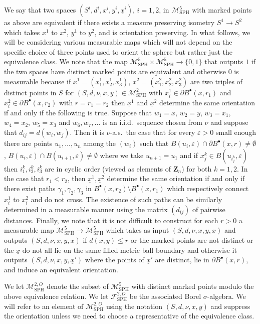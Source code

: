 \documentclass[10pt]{amsart}
\let\mathcal\mathscr
\newcommand{\sbullet}{{\scriptscriptstyle\bullet}}
\let\epsilon\varepsilon
\theoremstyle{plain}
\numberwithin{theorem}{section}
\theoremstyle{definition}
\newcommand\gmsspace{{\mathcal M}_{\mathrm{SPH}}}
\newcommand{\mmsigmaspho}{{\mathcal F}_{\mathrm{SPH}}^{2,O}}
\newcommand{\Z}{\mathbf{Z}}
\let\ul\underline
\newcommand{\fb}[2]{B^\sbullet(#1,#2)}
\begin{document}
We say that two spaces $(S^i,d^i,x^i,y^i,\ul{x}^i)$, $i=1,2$, in $\gmsspace^5$ with marked points as above are equivalent if there exists a measure preserving isometry $S^1 \to S^2$ which takes $x^1$ to $x^2$, $y^1$ to $y^2$, and is orientation preserving. In what follows, we will be considering various measurable maps which will not depend on the specific choice of three points used to orient the sphere but rather just the equivalence class. We note that the map $\gmsspace^5 \times \gmsspace^5 \to \{0,1\}$ that outputs $1$ if the two spaces have distinct marked points are equivalent and otherwise $0$ is measurable because if $\ul{x}^1 = (x_1^1,x_2^1,x_3^1)$, $\ul{x}^2 = (x_1^2,x_2^2,x_3^2)$ are two triples of distinct points in $S$ for $(S,d,\nu,x,y) \in \gmsspace^2$ with $x_i^1 \in \partial \fb{x}{r_1}$ and $x_i^2 \in \partial \fb{x}{r_2}$ with $r = r_1 = r_2$ then $\ul{x}^1$ and $\ul{x}^2$ determine the same orientation if and only if the following is true. Suppose that $w_1=x$, $w_2 = y$, $w_3=x_1$, $w_4=x_2$, $w_5 = x_3$ and $w_6,w_7,\ldots$ is an i.i.d.\ sequence chosen from $\nu$ and suppose that $d_{ij} = d(w_i,w_j)$. Then it is $\nu$-a.s.\ the case that for every $\epsilon > 0$ small enough there are points $u_1,\ldots,u_n$ among the $(w_i)$ such that $B(u_i,\epsilon) \cap \partial \fb{x}{r} \neq \emptyset$, $B(u_i,\epsilon) \cap B(u_{i+1},\epsilon) \neq \emptyset$ where we take $u_{n+1} = u_1$ and if $x_j^k \in B(u_{i_j^k},\epsilon)$ then $i_1^k,i_2^k,i_3^k$ are in cyclic order (viewed as elements of $\Z_n$) for both $k=1,2$. In the case that $r_1 < r_2$, then $\ul{x}^1, \ul{x}^2$ determine the same orientation if and only if there exist paths $\gamma_1,\gamma_2,\gamma_3$ in $\fb{x}{r_2} \setminus \fb{x}{r_1}$ which respectively connect $x_i^1$ to $x_i^2$ and do not cross. The existence of such paths can be similarly determined in a measurable manner using the matrix $(d_{ij})$ of pairwise distances. Finally, we note that it is not difficult to construct for each $r > 0$ a measurable map $\gmsspace^{5} \to \gmsspace^{5}$ which takes as input $(S,d,\nu,x,y,\ul{x})$ and outputs $(S,d,\nu,x,y,\ul{x})$ if $d(x,y) \leq r$ or the marked points are not distinct or the $\ul{x}$ do not all lie on the same filled metric ball boundary and otherwise it outputs $(S,d,\nu,x,y,\ul{x}')$ where the points of $\ul{x}'$ are distinct, lie in $\partial \fb{x}{r}$, and induce an equivalent orientation.

We let $\gmsspace^{2,O}$ denote the subset of $\gmsspace^5$ with distinct marked points modulo the above equivalence relation. We let $\mmsigmaspho$ be the associated Borel $\sigma$-algebra. We will refer to an element of $\gmsspace^{2,O}$ using the notation $(S,d,\nu,x,y)$ and suppress the orientation unless we need to choose a representative of the equivalence class.
\end{document}
